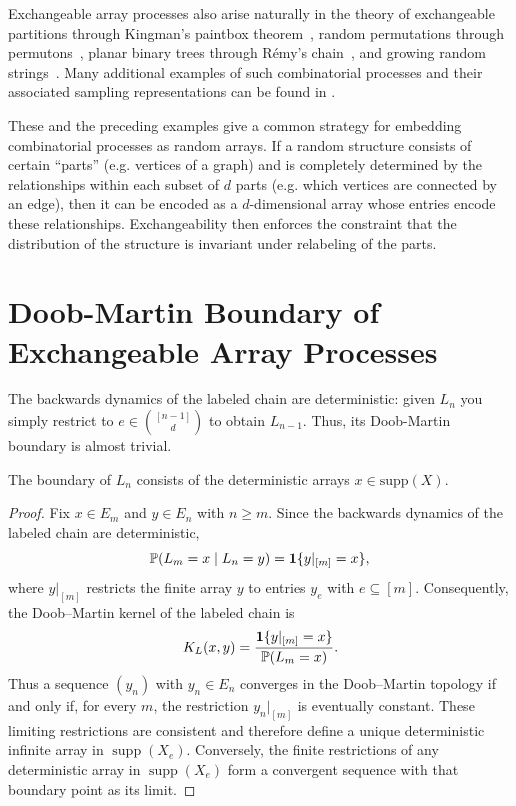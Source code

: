 \noindent Exchangeable array processes also arise naturally in the theory of
exchangeable partitions through Kingman's paintbox theorem~\cite{austin2013_exchangeable_random_arrays}, random permutations through
permutons~\cite{grubel2023_ranks_copulas_permutons}, planar binary trees through R\'emy's chain~\cite{evans2014_doob_martin_remy_tree_growth}, and growing
random strings~\cite{choi2016_doob_martin_growing_random_words}. Many additional examples
of such combinatorial processes and their associated sampling representations can be found in
\cite{pitman2006_combinatorial_stochastic_processes}.

These and the preceding examples give a common strategy for embedding combinatorial processes as random arrays.
If a random structure consists of certain ``parts'' (e.g. vertices of a graph) and is completely determined by the
relationships within each subset of $d$ parts (e.g. which vertices are connected by an edge), then it can be
encoded as a $d$-dimensional array whose entries encode these relationships. Exchangeability then enforces the
constraint that the distribution of the structure is invariant under relabeling of the parts.

\section{Doob-Martin Boundary of Exchangeable Array Processes}
\label{sec:exchangeable_array_boundary}

\noindent The backwards dynamics of the labeled chain are deterministic: given $L_n$ you simply restrict
to $e \in \binom{[n-1]}{d}$ to obtain $L_{n-1}$. Thus, its Doob-Martin boundary is almost trivial.
%
\begin{lemma} \label{lem:boundary_labeled_chain}
    The boundary of $L_n$ consists of the deterministic arrays $x \in \mathrm{supp}(X)$.
\end{lemma}

\begin{proof}
Fix $x\in E_m$ and $y\in E_n$ with $n\geq m$. Since the backwards dynamics
of the labeled chain are deterministic,
\[
\mathbb{P}(L_m=x\mid L_n=y)=\mathbf{1}\{y|_{[m]}=x\},
\]
where $y|_{[m]}$ restricts the finite array $y$ to entries $y_e$ with $e \subseteq [m]$. 
Consequently, the Doob--Martin kernel of the labeled chain is
\[
K_L(x,y)=\frac{\mathbf{1}\{y|_{[m]}=x\}}{\mathbb{P}(L_m=x)}.
\]
Thus a sequence $(y_n)$ with $y_n\in E_n$ converges in the Doob--Martin
topology if and only if, for every $m$, the restriction $y_n|_{[m]}$ is
eventually constant. These limiting restrictions are consistent and therefore
define a unique deterministic infinite array in $\operatorname{supp}(X_e)$.
Conversely, the finite restrictions of any deterministic array in
$\operatorname{supp}(X_e)$ form a convergent sequence with that boundary
point as its limit.
\end{proof}

